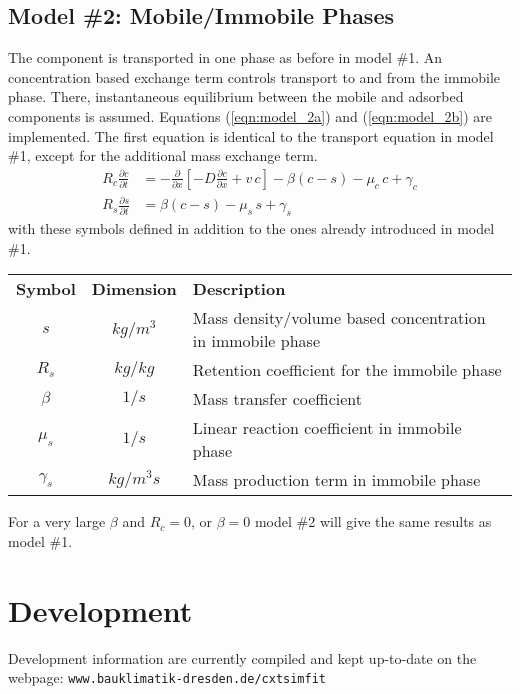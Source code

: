 \documentclass[a4paper,fleqn,11pt]{article}
\numberwithin{equation}{section}
\newcommand{\eqn}[1]{(\ref{#1})}
\begin{document}
\subsection{Model \#2: Mobile/Immobile Phases}
The component is transported in one phase as before in model \#1. An concentration based exchange term controls transport to and from the immobile phase. There, instantaneous equilibrium between the mobile and adsorbed components is assumed. Equations \eqn{eqn:model_2a} and \eqn{eqn:model_2b} are implemented. The first equation is identical to the transport equation in model \#1, except for the additional mass exchange term.
\begin{align}
R_c \frac{\partial c}{\partial t} &= -\frac{\partial }{\partial x}\left[ - D\frac{\partial c}{\partial x} + v\,c \right] - \beta\left(c - s\right) - \mu_c\,c + \gamma_c \label{eqn:model_2a} \\
R_s \frac{\partial s}{\partial t} &= \beta\left(c - s\right) - \mu_s\,s + \gamma_s \label{eqn:model_2b}
\end{align}
with these symbols defined in addition to the ones already introduced in model \#1.
\begin{center}
\footnotesize
\begin{tabular}{ccl}
  \textbf{Symbol} & \textbf{Dimension} & \textbf{Description} \\[1mm]
  $s$ & $kg/m^3$ & Mass density/volume based concentration in immobile phase\\
  $R_s$ & $kg/kg$ & Retention coefficient for the immobile phase\\
  $\beta$ & $1/s$ & Mass transfer coefficient\\
  $\mu_s$ & $1/s$ & Linear reaction coefficient in immobile phase\\
  $\gamma_s$ & $kg/m^3s$ & Mass production term in immobile phase
\end{tabular}
\end{center}
For a very large $\beta$ and $R_c=0$, or $\beta=0$ model \#2 will give the same results as model \#1.

\section{Development}\label{sec:development}
Development information are currently compiled and kept up-to-date on the webpage: \texttt{www.bauklimatik-dresden.de/cxtsimfit}
\end{document}
